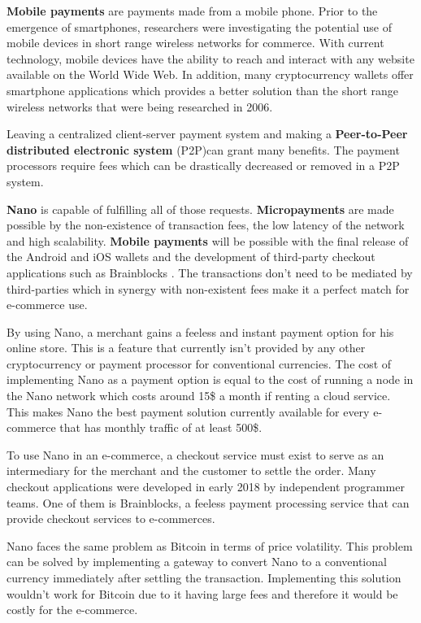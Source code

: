 \documentclass{ferseminar}
\begin{document}
\textbf{Mobile payments} are payments made from a mobile phone. Prior to the emergence of smartphones, researchers were investigating the potential use of mobile devices in short range wireless networks for commerce. With current technology, mobile devices have the ability to reach and interact with any website available on the World Wide Web. In addition, many cryptocurrency wallets offer smartphone applications which provides a better solution than the short range wireless networks that were being researched in 2006.  

Leaving a centralized client-server payment system and making a \textbf{Peer-to-Peer distributed electronic system} (P2P)can grant many benefits. The payment processors require fees which can be drastically decreased or removed in a P2P system.

\textbf{Nano} is capable of fulfilling all of those requests. \textbf{Micropayments} are made possible by the non-existence of transaction fees, the low latency of the network and high scalability. \textbf{Mobile payments} will be possible with the final release of the Android and iOS wallets and the development of third-party checkout applications such as Brainblocks \cite{Brainblocks}. The transactions don't need to be mediated by third-parties which in synergy with non-existent fees make it a perfect match for e-commerce use.

By using Nano, a merchant gains a feeless and instant payment option for his online store. This is a feature that currently isn't provided by any other cryptocurrency or payment processor for conventional currencies. The cost of implementing Nano as a payment option is equal to the cost of running a node in the Nano network which costs around 15\$ a month if renting a cloud service. This makes Nano the best payment solution currently available for every e-commerce that has monthly traffic of at least 500\$.

To use Nano in an e-commerce, a checkout service must exist to serve as an intermediary for the merchant and the customer to settle the order. Many checkout applications were developed in early 2018 by independent programmer teams. One of them is Brainblocks, a feeless payment processing service that can provide checkout services to e-commerces.

Nano faces the same problem as Bitcoin in terms of price volatility. This problem can be solved by implementing a gateway to convert Nano to a conventional currency immediately after settling the transaction. Implementing this solution wouldn't work for Bitcoin due to it having large fees and therefore it would be costly for the e-commerce. 
\end{document}
